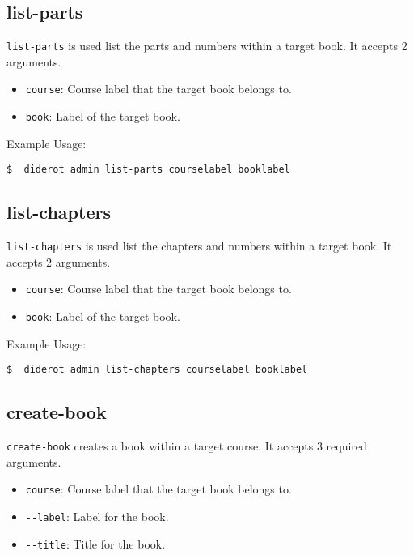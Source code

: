 \subsection{list-parts}

\verb|list-parts| is used list the parts and numbers within a target book.
It accepts 2 arguments.

\begin{itemize}
  \item \verb|course|: Course label that the target book belongs to.
  \item \verb|book|: Label of the target book.
\end{itemize}

Example Usage:
\begin{verbatim}
$  diderot admin list-parts courselabel booklabel
\end{verbatim}

\subsection{list-chapters}

\verb|list-chapters| is used list the chapters and numbers within a target book.
It accepts 2 arguments.

\begin{itemize}
  \item \verb|course|: Course label that the target book belongs to.
  \item \verb|book|: Label of the target book.
\end{itemize}

Example Usage:
\begin{verbatim}
$  diderot admin list-chapters courselabel booklabel
\end{verbatim}


\subsection{create-book}

\verb|create-book| creates a book within a target course. It accepts 3 required arguments.

\begin{itemize}
  \item \verb|course|: Course label that the target book belongs to.
  \item \verb|--label|: Label for the book.
  \item \verb|--title|: Title for the book.
\end{itemize}

